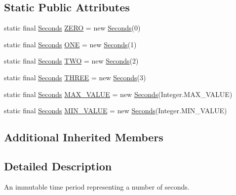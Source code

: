 \subsection*{Static Public Attributes}
\begin{DoxyCompactItemize}
\item 
static final \hyperlink{classorg_1_1joda_1_1time_1_1_seconds}{Seconds} \hyperlink{classorg_1_1joda_1_1time_1_1_seconds_ac79413781a6567541fa8394c05436371}{Z\-E\-R\-O} = new \hyperlink{classorg_1_1joda_1_1time_1_1_seconds}{Seconds}(0)
\item 
static final \hyperlink{classorg_1_1joda_1_1time_1_1_seconds}{Seconds} \hyperlink{classorg_1_1joda_1_1time_1_1_seconds_acd3a648de2f7043bd31cee6d0b036cf5}{O\-N\-E} = new \hyperlink{classorg_1_1joda_1_1time_1_1_seconds}{Seconds}(1)
\item 
static final \hyperlink{classorg_1_1joda_1_1time_1_1_seconds}{Seconds} \hyperlink{classorg_1_1joda_1_1time_1_1_seconds_a321d84ae2c435142ebff7067643cfe99}{T\-W\-O} = new \hyperlink{classorg_1_1joda_1_1time_1_1_seconds}{Seconds}(2)
\item 
static final \hyperlink{classorg_1_1joda_1_1time_1_1_seconds}{Seconds} \hyperlink{classorg_1_1joda_1_1time_1_1_seconds_ac4bc1b0c2199733a0328bf16556fd159}{T\-H\-R\-E\-E} = new \hyperlink{classorg_1_1joda_1_1time_1_1_seconds}{Seconds}(3)
\item 
static final \hyperlink{classorg_1_1joda_1_1time_1_1_seconds}{Seconds} \hyperlink{classorg_1_1joda_1_1time_1_1_seconds_a33589dbddfc416d9f18da5f0e36caed1}{M\-A\-X\-\_\-\-V\-A\-L\-U\-E} = new \hyperlink{classorg_1_1joda_1_1time_1_1_seconds}{Seconds}(Integer.\-M\-A\-X\-\_\-\-V\-A\-L\-U\-E)
\item 
static final \hyperlink{classorg_1_1joda_1_1time_1_1_seconds}{Seconds} \hyperlink{classorg_1_1joda_1_1time_1_1_seconds_a44dd49d566cc994da5e5d683c2c4ef7d}{M\-I\-N\-\_\-\-V\-A\-L\-U\-E} = new \hyperlink{classorg_1_1joda_1_1time_1_1_seconds}{Seconds}(Integer.\-M\-I\-N\-\_\-\-V\-A\-L\-U\-E)
\end{DoxyCompactItemize}
\subsection*{Additional Inherited Members}


\subsection{Detailed Description}
An immutable time period representing a number of seconds. 

